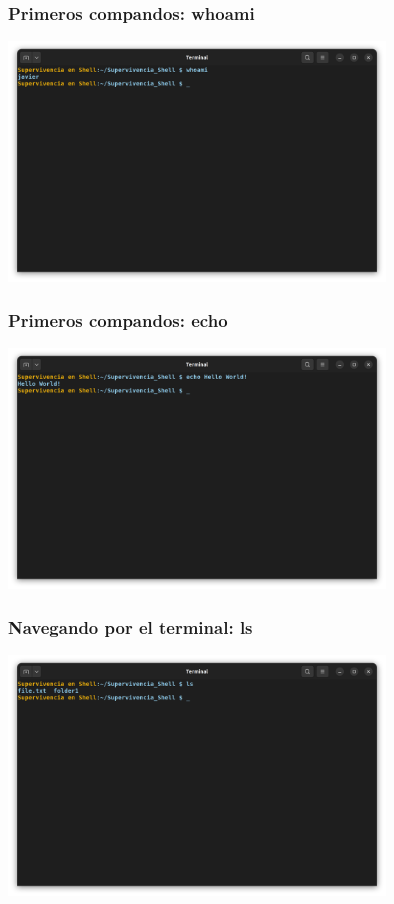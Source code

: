 \documentclass[10pt]{beamer}
\begin{document}
	\begin{frame}
		\frametitle{Primeros compandos: whoami}
		\includegraphics[width=0.75\textwidth]{whoami}
	\end{frame}
	
	\begin{frame}
		\frametitle{Primeros compandos: echo}
		\includegraphics[width=0.75\textwidth]{echo}
	\end{frame}
	
	\begin{frame}
		\frametitle{Navegando por el terminal: ls}
		\includegraphics[width=0.75\textwidth]{ls}
	\end{frame}
	
\end{document}
